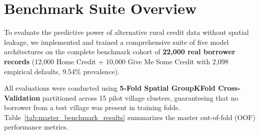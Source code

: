 \documentclass[11pt,a4paper,oneside]{report}
\begin{document}
\section{Benchmark Suite Overview}
To evaluate the predictive power of alternative rural credit data without spatial leakage, we implemented and trained a comprehensive suite of five model architectures on the complete benchmark cohort of \textbf{22,000 real borrower records} (12,000 Home Credit + 10,000 Give Me Some Credit with 2,098 empirical defaults, 9.54\% prevalence). 

All evaluations were conducted using \textbf{5-Fold Spatial GroupKFold Cross-Validation} partitioned across 15 pilot village clusters, guaranteeing that no borrower from a test village was present in training folds. Table~\ref{tab:master_benchmark_results} summarizes the master out-of-fold (OOF) performance metrics.
\end{document}
